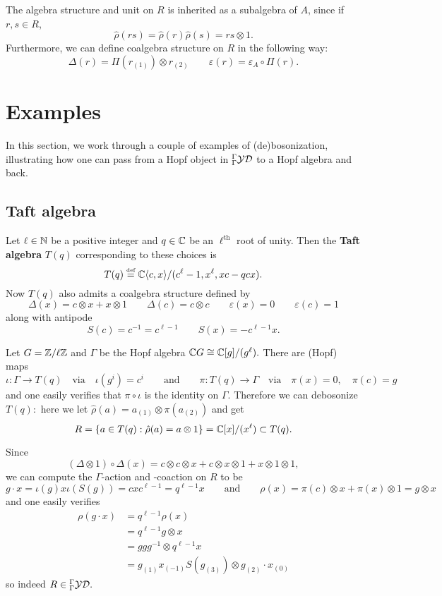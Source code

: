 \documentclass [11pt, proquest] {uwthesis}[2020/02/24]
\begin{document}
    The algebra structure and unit on $R$ is inherited as a subalgebra of $A$, since if $r,s\in R$, \[\hat\rho(rs)=\hat\rho(r)\hat\rho(s)=rs\otimes 1.\]
    Furthermore, we can define coalgebra structure on $R$ in the following way:
    \[\Delta(r)=\Pi(r_{(1)})\otimes r_{(2)}\qquad \varepsilon(r)=\varepsilon_A\circ \Pi(r).\]

\section{Examples}
    In this section, we work through a couple of examples of (de)bosonization, illustrating how one can pass from a Hopf object in ${^\Gamma_\Gamma\mathcal{YD}}$ to a Hopf algebra and back.
\subsection{Taft algebra}
    Let $\ell\in\mathbb{N}$ be a positive integer and $q\in\mathbb{C}$ be an $\ell^\text{th}$ root of unity. Then the \textbf{Taft algebra} $T(q)$ corresponding to these choices is
    \[T(q)\stackrel{\text{\tiny def}}{=} \mathbb{C}\langle c,x\rangle/( c^\ell-1, x^\ell, xc-qcx).\]
    Now $T(q)$ also admits a coalgebra structure defined by
    \[\Delta(x)=c\otimes x + x\otimes 1\qquad \Delta(c)=c\otimes c\qquad \varepsilon(x)=0\qquad \varepsilon(c)=1\]
    along with antipode
    \[S(c)=c^{-1}=c^{\ell-1}\qquad S(x)=-c^{\ell-1}x.\]
    
    Let $G=\mathbb{Z}/\ell\mathbb{Z}$ and $\Gamma$ be the Hopf algebra $\mathbb{C} G\cong\mathbb{C}[g]/(g^\ell).$ There are (Hopf) maps
    \[\iota:\Gamma\to T(q)\quad\text{via}\quad \iota(g^i)=c^i\qquad\text{and}\qquad \pi:T(q)\to \Gamma\quad\text{via}\quad \pi(x)=0,\quad\pi(c)=g\]
    and one easily verifies that $\pi\circ\iota$ is the identity on $\Gamma.$ Therefore we can debosonize $T(q):$ here we let $\hat\rho(a)=a_{(1)}\otimes \pi(a_{(2)})$ and get
    \[R=\{a\in T(q):\hat\rho(a)=a\otimes 1\}=\mathbb{C}[x]/(x^\ell)\subset T(q).\]
    
    Since
    \[(\Delta\otimes 1)\circ\Delta(x)=c\otimes c\otimes x+c\otimes x\otimes 1+x\otimes 1\otimes 1,\]
    we can compute the $\Gamma$-action and -coaction on $R$ to be
    \[g\cdot x = \iota(g)x\iota(S(g))=cxc^{\ell-1}=q^{\ell-1}x\qquad\text{and}\qquad\rho(x)=\pi(c)\otimes x + \pi(x)\otimes 1 = g\otimes x\]
    and one easily verifies
    \begin{align*}
        \rho(g\cdot x)&=q^{\ell-1}\rho(x)\\
        &=q^{\ell-1}g\otimes x\\
        &=ggg^{-1}\otimes q^{\ell-1}x\\
        &=g_{(1)}x_{(-1)}S(g_{(3)})\otimes g_{(2)}\cdot x_{(0)}
    \end{align*}
    so indeed $R\in{^\Gamma_\Gamma\mathcal{YD}}.$
    
\end{document}
